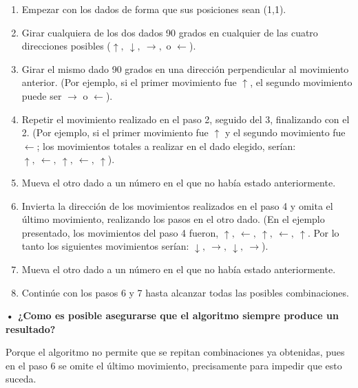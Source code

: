 \documentclass[11pt,letterpaper]{article}
\begin{document}
\begin{enumerate}
\item Empezar con los dados de forma que sus posiciones sean (1,1).
\item Girar cualquiera de los dos dados 90 grados en cualquier de las cuatro direcciones posibles ($\uparrow, \ \downarrow, \ \rightarrow, $ o $ \leftarrow$).
\item Girar el mismo dado 90 grados en una dirección perpendicular al movimiento anterior. (Por ejemplo, si el primer movimiento fue $\uparrow$, el segundo movimiento puede ser $\rightarrow$ o $\leftarrow$).
\item Repetir el movimiento realizado en el paso 2, seguido del 3, finalizando con el 2. (Por ejemplo, si el primer movimiento fue $\uparrow$ y el segundo movimiento fue $\leftarrow$; los movimientos totales a realizar en el dado elegido, serían: $\uparrow, \ \leftarrow, \ \uparrow, \ \leftarrow, \ \uparrow$).
\item Mueva el otro dado a un número en el que no había estado anteriormente.
\item Invierta la dirección de los movimientos realizados en el paso 4 y omita el último movimiento, realizando los pasos en el otro dado. (En el ejemplo presentado, los movimientos del paso 4 fueron, $\uparrow, \ \leftarrow, \ \uparrow, \ \leftarrow, \ \uparrow$. Por lo tanto los siguientes movimientos serían: $\downarrow, \ \rightarrow, \ \downarrow, \ \rightarrow$).
\item Mueva el otro dado a un número en el que no había estado anteriormente.
\item Continúe con los pasos 6 y 7 hasta alcanzar todas las posibles combinaciones.
\end{enumerate}

\textbf{• ¿Como es posible asegurarse que el algoritmo siempre produce un resultado?}

\noindent Porque el algoritmo no permite que se repitan combinaciones ya obtenidas, pues en el paso 6 se omite el último movimiento, precisamente para impedir que esto suceda.
\end{document}
